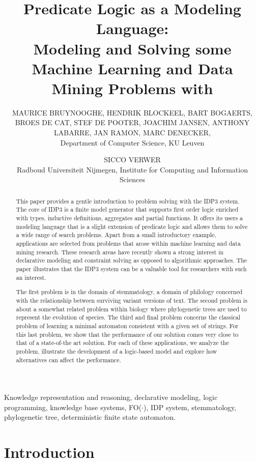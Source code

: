 \documentclass{tlp}
\title[Predicate Logic as a Modeling Language]
{Predicate Logic as a Modeling Language:\\
Modeling and Solving some Machine Learning and Data Mining Problems with \idpdrie}
\author[Bruynooghe et al.]
{MAURICE BRUYNOOGHE, HENDRIK BLOCKEEL, BART BOGAERTS, \authorbreak
  BROES DE CAT,  STEF DE POOTER, JOACHIM JANSEN,  \authorbreak ANTHONY
  LABARRE, JAN RAMON, MARC DENECKER, \\ Department of
  Computer Science, KU Leuven \and SICCO VERWER \\Radboud Universiteit
  Nijmegen, Institute for Computing and Information Sciences \\
\email{firstname.secondname@cs.kuleuven.be, siccoverwer@gmail.com}}
\newcommand{\idp}{{\sc IDP}\xspace}
\newcommand{\idpdrie}{{\sc IDP3}\xspace}
\newcommand{\fodot}{{\sc FO($\cdot$)}\xspace}
\renewcommand{\|}{\ensuremath{\,|\,}}
\renewcommand{\|}{\,|\,}
\begin{document}
\maketitle
\begin{abstract} 


  This paper provides a gentle introduction to problem solving with
  the \idpdrie system. The core of \idpdrie is a finite model
  generator that supports first order logic enriched with types,
  inductive definitions, aggregates and partial functions. It offers
  its users a modeling language that is a slight extension of
  predicate logic and allows them to solve a wide range of search
  problems.
%
  Apart from a small introductory example, applications are selected
  from problems that arose within machine learning and data mining
  research. These research areas have recently shown a strong interest
  in declarative modeling and constraint solving as opposed to
  algorithmic approaches. The paper illustrates that the \idpdrie
  system can be a valuable tool for researchers with such an
  interest.

  The first problem is in the domain of stemmatology, a domain of
  philology concerned with the relationship between surviving variant
  versions of text.
%
  The second problem is about a somewhat related problem within
  biology where phylogenetic trees are used to represent the evolution
  of species.
%
  The third and final problem concerns the classical problem of learning
  a minimal automaton consistent with a given set of strings. For this
  last problem, we show that the performance of our solution comes
  very close to that of a state-of-the art solution. 
%
  For each of these applications, we analyze the problem, illustrate
  the development of a logic-based model and explore how alternatives
  can affect the performance.
%
\end{abstract}

\begin{keywords}
  Knowledge representation and reasoning, declarative modeling, logic
  programming, knowledge base systems, \fodot, \idp system,
  stemmatology, phylogenetic tree, deterministic finite state automaton.
\end{keywords}


\section{Introduction}

\end{document}
